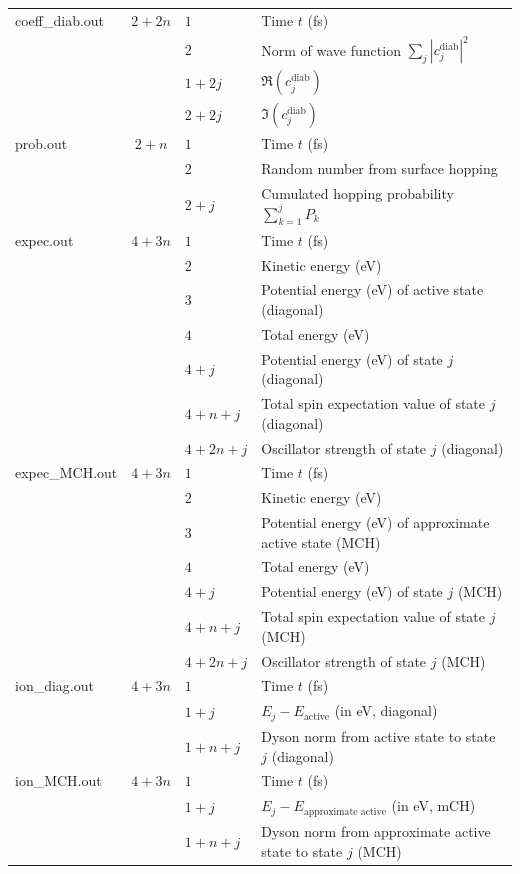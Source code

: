 \documentclass[a4paper,10pt,DIV=15,openany,twoside=false]{scrbook}
\begin{document}
\begin{table}[tbp]
\begin{tabular}{>{\ttfamily}lcll}
    coeff\_diab.out       &$2+2n$
      &$1$ &Time $t$ (fs)\\
      &&$2$ &Norm of wave function $\sum_j |c_j^{\text{diab}}|^2$\\
      &&$1+2j$ &$\Re (c_j^{\text{diab}})$\\
      &&$2+2j$ &$\Im (c_j^{\text{diab}})$\\
    prob.out       &$2+n$
      &$1$ &Time $t$ (fs)\\
      &&$2$ &Random number from surface hopping\\
      &&$2+j$ &Cumulated hopping probability $\sum_{k=1}^j P_k$\\
    expec.out      &$4+3n$
      &$1$ &Time $t$ (fs)\\
      &&$2$ &Kinetic energy (eV)\\
      &&$3$ &Potential energy (eV) of active state (diagonal)\\
      &&$4$ &Total energy (eV)\\
      &&$4+j$ &Potential energy (eV) of state $j$ (diagonal)\\
      &&$4+n+j$ &Total spin expectation value of state $j$ (diagonal)\\
      &&$4+2n+j$ &Oscillator strength of state $j$ (diagonal)\\
    expec\_MCH.out      &$4+3n$
      &$1$ &Time $t$ (fs)\\
      &&$2$ &Kinetic energy (eV)\\
      &&$3$ &Potential energy (eV) of approximate active state (MCH)\\
      &&$4$ &Total energy (eV)\\
      &&$4+j$ &Potential energy (eV) of state $j$ (MCH)\\
      &&$4+n+j$ &Total spin expectation value of state $j$ (MCH)\\
      &&$4+2n+j$ &Oscillator strength of state $j$ (MCH)\\
    ion\_diag.out      &$4+3n$
      &$1$ &Time $t$ (fs)\\
      &&$1+j$ &$E_j-E_\text{active}$ (in eV, diagonal)\\
      &&$1+n+j$ &Dyson norm from active state to state $j$ (diagonal)\\
    ion\_MCH.out      &$4+3n$
      &$1$ &Time $t$ (fs)\\
      &&$1+j$ &$E_j-E_\text{approximate active}$ (in eV, mCH)\\
      &&$1+n+j$ &Dyson norm from approximate active state to state $j$ (MCH)\\
    \bottomrule
  \end{tabular}
\end{table}
\end{document}
